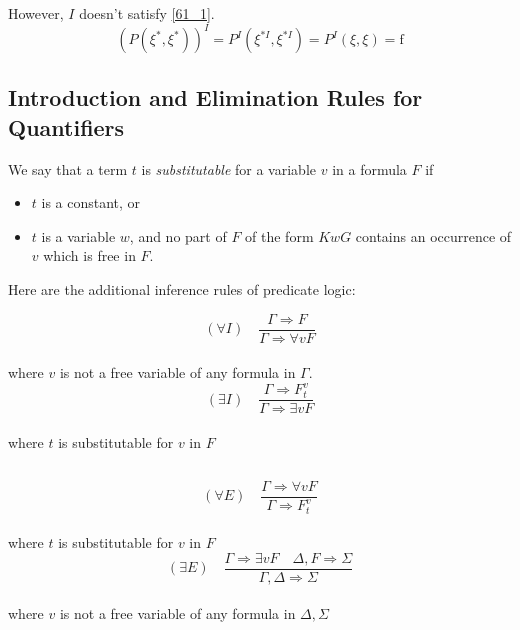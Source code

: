 \begin{enumerate}
However, $I$ doesn't satisfy \eqref{61_1}. 
\begin{equation*}
(P(\xi^*, \xi^*))^I = P^I(\xi^{*I}, \xi^{*I}) = P^I(\xi, \xi) = \mathrm{f}
\end{equation*}


\end{enumerate}
\newpage

\subsection{Introduction and Elimination Rules for Quantifiers}
We say that a term $t$ is \textit{substitutable} for a variable $v$ in a formula $F$ if 
\begin{itemize}
\item $t$ is a constant, or 
\item $t$ is a variable $w$, and no part of $F$ of the form $KwG$ contains an occurrence of $v$ which is free in $F$. 
\end{itemize}
\noindent
Here are the additional inference rules of predicate logic:

\begin{center}
\begin{minipage}[t]{0.3\textwidth}
\begin{equation*}
(\forall I) \quad \frac{ \Gamma \Rightarrow F}{\Gamma \Rightarrow \forall v F }
\end{equation*} \\
where $v$ is not a free variable of any formula in $\Gamma$. \\
\begin{equation*}
(\exists I) \quad \frac{ \Gamma \Rightarrow F_t^v}{\Gamma \Rightarrow \exists v F}
\end{equation*}\\
where $t$ is substitutable for $v$ in $F$
\end{minipage}
\begin{minipage}[t]{0.1\textwidth}
$\quad$
\end{minipage}
\begin{minipage}[t]{0.3\textwidth}
\begin{equation*}
(\forall E) \quad \frac{ \Gamma \Rightarrow \forall vF }{\Gamma \Rightarrow F_t^v}
\end{equation*} \\
where $t$ is substitutable for $v$ in $F$ \\
\begin{equation*}
(\exists E) \quad \frac{ \Gamma \Rightarrow \exists vF \quad \Delta, F \Rightarrow \Sigma }
{\Gamma , \Delta \Rightarrow \Sigma}
\end{equation*} \\
where $v$ is not a free variable of any formula in $\Delta, \Sigma$
\end{minipage}
\end{center}

